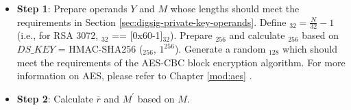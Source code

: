 \documentclass[main\_\_EN.tex]{subfiles}
\begin{document}
\begin{itemize}

    \item {\bfseries Step 1}: Prepare operands \begin{math}Y\end{math} and \begin{math}M\end{math} whose lengths should meet the requirements in Section \ref{sec:digsig-private-key-operands}. Define \begin{math}[L]_{32} = \frac{N}{32}-1 \end{math} (i.e., for RSA 3072, \begin{math}[L]_{32}\end{math} == [0x60-1]\begin{math}_{32}\end{math}). Prepare \begin{math}[HMAC\_KEY]_{256}\end{math} and calculate \begin{math}[DS\_KEY]_{256}\end{math} based on \begin{math}DS\_KEY\end{math} = HMAC-SHA256 (\begin{math}[HMAC\_KEY]_{256}\end{math}, \begin{math}1^{256}\end{math}). Generate a random \begin{math}[IV]_{128}\end{math} which should meet the requirements of the AES-CBC block encryption algorithm. For more information on AES, please refer to Chapter \ref{mod:aes} \textit{}.
    
    \item {\bfseries Step 2}: Calculate \begin{math}\overline{r}\end{math} and \begin{math}M^{\prime} \end{math} based on \begin{math}M\end{math}.
    

\end{itemize}
\end{document}
